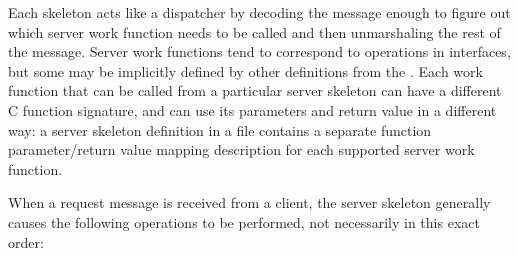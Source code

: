 Each skeleton acts like a dispatcher by decoding the message enough to figure
out which server work function needs to be called and then unmarshaling the
rest of the message.  Server work functions tend to correspond to operations in
interfaces, but some may be implicitly defined by other definitions from the
\IDL{}\@.  Each work function that can be called from a particular
server skeleton can have a different C function signature, and can use
its parameters and return value in a different way: a server skeleton
definition in a \PRESC{} file contains a separate function
parameter/return value mapping description for each supported server
work function.

When a request message is received from a client, the server skeleton generally
causes the following operations to be performed, not necessarily in this exact
order:

